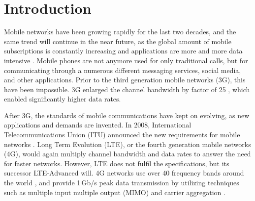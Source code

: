 \section{Introduction}
\label{sec:introduction}

\thispagestyle{empty}

\begin{comment}
\begin{itemize}
\item[--]Tutkimuksen taustaa ja tutkimusaiheen yleisluonteinen esittely
\item[--]Tutkimuksen tavoitteet
\item[--]Pääkysymys ja osaongelmat
\item[--]Tutkimuksen rajaus ja keskeiset käsitteet.
\item[--]Työn rakenne
\end{itemize}
\end{comment}

Mobile networks have been growing rapidly for the last two decades, and the same trend will continue in the near future, as the global amount of mobile subscriptions is constantly increasing and applications are more and more data intensive \cite{nokia,cisco,ericsson,gsma}. Mobile phones are not anymore used for only traditional calls, but for communicating through a numerous different messaging services, social media, and other applications. Prior to the third generation mobile networks (3G), this have been impossible. 3G enlarged the channel bandwidth by factor of 25 \cite{molisch}, which enabled significantly higher data rates.

After 3G, the standards of mobile communications have kept on evolving, as new applications and demands are invented. In 2008, International Telecommunications Union (ITU) announced the new requirements for mobile networks \cite{itur}. Long Term Evolution (LTE), or the fourth generation mobile networks (4G), would again multiply channel bandwidth and data rates to answer the need for faster networks. However, LTE does not fulfil the specifications, but its successor LTE-Advanced will. 4G networks use over 40 frequency bands around the world \cite{radio_electronics,molisch}, and provide 1\,Gb/s peak data transmission by utilizing techniques such as multiple input multiple output (MIMO) and carrier aggregation \cite{parkvall_lte}.

